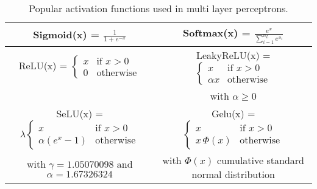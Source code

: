\begin{table}[h]
	\caption{Popular activation functions used in multi layer perceptrons.}
	\label{tab:activation_functions}
	\begin{center}
		\begin{tabular}{c|c}
			\toprule
			Sigmoid(x) = $ \frac{1}{1 + e^{-x}}$                 &
			Softmax(x) = $\frac{e^x}{\sum_{i=1}^{n_L} e^{x_i}}$                                                           \\
			\midrule
			ReLU(x)\cite{glorot2011deep} = $\begin{cases}
					                                x & \text{if } x > 0 \\
					                                0 & \text{otherwise}
				                                \end{cases}$        &
			LeakyReLU(x)\cite{maas2013rectifier} =  $\begin{cases}
					                                         x        & \text{if } x > 0 \\
					                                         \alpha x & \text{otherwise}
				                                         \end{cases}$
			\\ & with $\alpha \ge 0$
			\\
			\midrule
			SeLU(x)\cite{klambauer2017self} = $\lambda \begin{cases}
					                                           x               & \text{if } x > 0 \\
					                                           \alpha(e^x - 1) & \text{otherwise}
				                                           \end{cases}$
			                                                     &
			Gelu(x)\cite{hendrycks2016gaussian} = $\begin{cases}
					                                       x            & \text{if } x > 0 \\
					                                       x \, \Phi(x) & \text{otherwise}
				                                       \end{cases}$
			\\
			with $\gamma = 1.05070098$ and $\alpha = 1.67326324$ & with $\Phi(x)$ cumulative standard normal distribution \\
			\bottomrule
		\end{tabular}
	\end{center}
\end{table}

